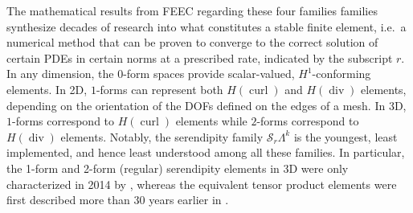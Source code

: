 \documentclass[format=acmsmall,screen,timestamp=false,a4paper]{acmart}
\DeclareMathOperator{\Div}{div}
\DeclareMathOperator{\curl}{curl}
\newcommand{\calS}{\mathcal{S}}
\newcommand{\hcurl}{\ensuremath{{H}(\curl)}\xspace}
\newcommand{\hdiv}{\ensuremath{{H}(\Div)}\xspace}
\begin{document}
    The mathematical results from FEEC regarding these four families families synthesize decades of research into what constitutes a stable finite element, i.e.\ a numerical method that can be proven to converge to the correct solution of certain PDEs in certain norms at a prescribed rate, indicated by the subscript $r$.  In any dimension, the $0$-form spaces provide scalar-valued, $H^1$-conforming elements.  In 2D, $1$-forms can represent both \hcurl and \hdiv elements, depending on the orientation of the DOFs defined on the edges of a mesh.  In 3D, $1$-forms correspond to \hcurl elements while $2$-forms correspond to \hdiv elements.  Notably, the serendipity family $\calS_r\Lambda^k$ is the youngest, least implemented, and hence least understood among all these families.  In particular, the 1-form and 2-form (regular) serendipity elements in 3D were only characterized in 2014 by \citet{arnold2014finite}, whereas the equivalent tensor product elements were first described more than 30 years earlier in \citet{N1980,N1986}.
 
\end{document}
